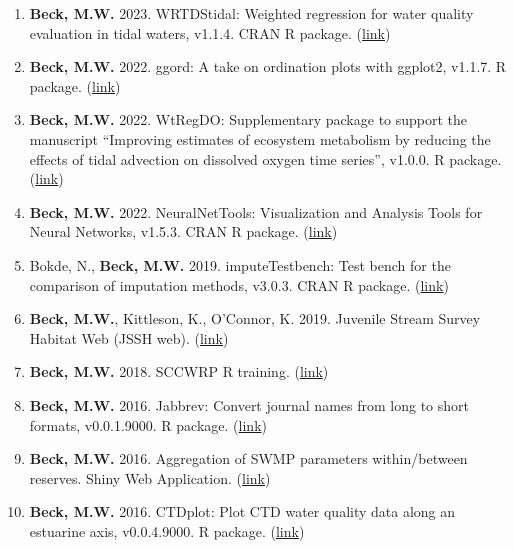 \documentclass[letterpaper,12pt]{article}
\begin{document}
\begin{enumerate}
\item \textbf{Beck, M.W.} 2023. WRTDStidal: Weighted regression for water quality evaluation in tidal waters, v1.1.4. CRAN R package. ({\footnotesize\href{https://cran.r-project.org/web/packages/WRTDStidal/index.html}{link}})

\item \textbf{Beck, M.W.} 2022. ggord: A take on ordination plots with ggplot2, v1.1.7. R package. ({\footnotesize\href{https://fawda123.github.io/ggord/}{link}})

\item \textbf{Beck, M.W.} 2022. WtRegDO: Supplementary package to support the manuscript ``Improving estimates of ecosystem metabolism by reducing the effects of tidal advection on dissolved oxygen time series'', v1.0.0. R package. ({\footnotesize\href{http://github.com/fawda123/WtRegDO}{link}})

\item \textbf{Beck, M.W.} 2022. NeuralNetTools: Visualization and Analysis Tools for Neural Networks, v1.5.3. CRAN R package. ({\footnotesize\href{http://cran.r-project.org/web/packages/NeuralNetTools/}{link}})

\item Bokde, N., \textbf{Beck, M.W.} 2019. imputeTestbench: Test bench for the comparison of imputation methods, v3.0.3. CRAN R package. ({\footnotesize\href{https://cran.r-project.org/web/packages/imputeTestbench/index.html}{link}})

\item \textbf{Beck, M.W.}, Kittleson, K., O'Connor, K. 2019. Juvenile Stream Survey Habitat Web (JSSH web). ({\footnotesize\href{https://sccwrp.shinyapps.io/jssh_web/}{link}})

\item \textbf{Beck, M.W.} 2018. SCCWRP R training. ({\footnotesize\href{https://sccwrp.github.io/SCCWRP_R_training/}{link}})

\item \textbf{Beck, M.W.} 2016. Jabbrev: Convert journal names from long to short formats, v0.0.1.9000. R package. ({\footnotesize\href{https://github.com/fawda123/Jabbrev}{link}})

\item \textbf{Beck, M.W.} 2016. Aggregation of SWMP parameters within/between reserves. Shiny Web Application. ({\footnotesize\href{http://beckmw.shinyapps.io/swmp_agg}{link}})

\item \textbf{Beck, M.W.} 2016. CTDplot: Plot CTD water quality data along an estuarine axis, v0.0.4.9000. R package. ({\footnotesize\href{https://github.com/fawda123/CTDplot}{link}})


\end{enumerate}
\end{document}
